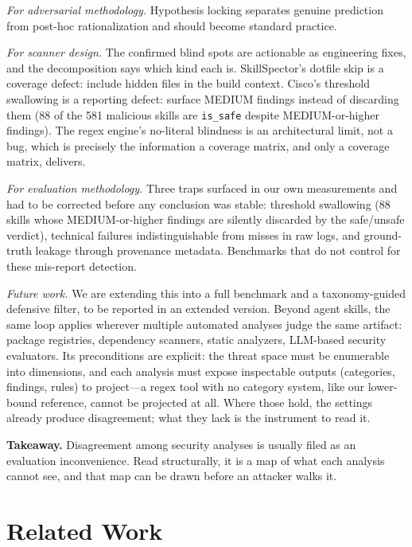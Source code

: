 \documentclass[sigconf,nonacm]{acmart}
\begin{document}
\emph{For adversarial methodology.} Hypothesis locking separates genuine prediction from post-hoc rationalization and should become standard practice.

\emph{For scanner design.} The confirmed blind spots are actionable as engineering fixes, and the decomposition says which kind each is. SkillSpector's dotfile skip is a coverage defect: include hidden files in the build context. Cisco's threshold swallowing is a reporting defect: surface MEDIUM findings instead of discarding them (88 of the 581 malicious skills are \texttt{is\_safe} despite MEDIUM-or-higher findings). The regex engine's no-literal blindness is an architectural limit, not a bug, which is precisely the information a coverage matrix, and only a coverage matrix, delivers.

\emph{For evaluation methodology.} Three traps surfaced in our own measurements and had to be corrected before any conclusion was stable: threshold swallowing (88 skills whose MEDIUM-or-higher findings are silently discarded by the safe/unsafe verdict), technical failures indistinguishable from misses in raw logs, and ground-truth leakage through provenance metadata. Benchmarks that do not control for these mis-report detection.

\emph{Future work.} We are extending this into a full benchmark and a taxonomy-guided defensive filter, to be reported in an extended version. Beyond agent skills, the same loop applies wherever multiple automated analyses judge the same artifact: package registries, dependency scanners, static analyzers, LLM-based security evaluators. Its preconditions are explicit: the threat space must be enumerable into dimensions, and each analysis must expose inspectable outputs (categories, findings, rules) to project---a regex tool with no category system, like our lower-bound reference, cannot be projected at all. Where those hold, the settings already produce disagreement; what they lack is the instrument to read it.

\medskip
\noindent\textbf{Takeaway.} Disagreement among security analyses is usually filed as an evaluation inconvenience. Read structurally, it is a map of what each analysis cannot see, and that map can be drawn before an attacker walks it.

\section{Related Work}
\label{sec:related}
\end{document}
